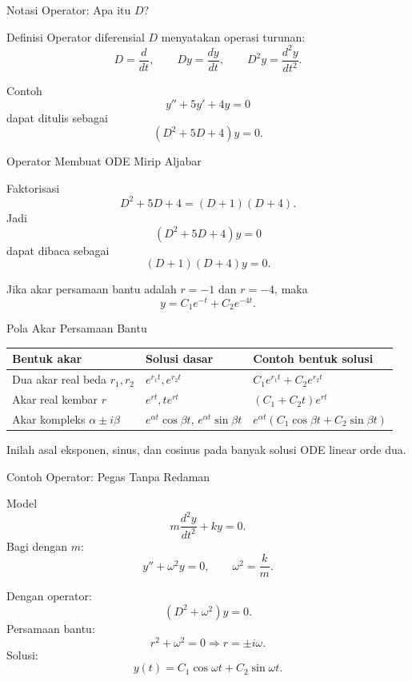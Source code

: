 \documentclass[aspectratio=169,11pt]{beamer}
\begin{document}
\begin{frame}{Notasi Operator: Apa itu $D$?}
\begin{block}{Definisi}
Operator diferensial $D$ menyatakan operasi turunan:
\[
D=\frac{d}{dt}, \qquad Dy=\frac{dy}{dt}, \qquad D^2y=\frac{d^2y}{dt^2}.
\]
\end{block}
\begin{exampleblock}{Contoh}
\[
 y''+5y'+4y=0
\]
dapat ditulis sebagai
\[
(D^2+5D+4)y=0.
\]
\end{exampleblock}
\end{frame}

\begin{frame}{Operator Membuat ODE Mirip Aljabar}
\begin{block}{Faktorisasi}
\[
D^2+5D+4=(D+1)(D+4).
\]
Jadi
\[
(D^2+5D+4)y=0
\]
dapat dibaca sebagai
\[
(D+1)(D+4)y=0.
\]
\end{block}
Jika akar persamaan bantu adalah $r=-1$ dan $r=-4$, maka
\[
\boxed{y=C_1e^{-t}+C_2e^{-4t}.}
\]
\end{frame}

\begin{frame}{Pola Akar Persamaan Bantu}
\scriptsize
\begin{tabular}{p{3.4cm}p{4.1cm}p{4.4cm}}
\toprule
\textbf{Bentuk akar} & \textbf{Solusi dasar} & \textbf{Contoh bentuk solusi} \\
\midrule
Dua akar real beda $r_1,r_2$ & $e^{r_1t}, e^{r_2t}$ & $C_1e^{r_1t}+C_2e^{r_2t}$ \\
Akar real kembar $r$ & $e^{rt}, te^{rt}$ & $(C_1+C_2t)e^{rt}$ \\
Akar kompleks $\alpha\pm i\beta$ & $e^{\alpha t}\cos\beta t$, $e^{\alpha t}\sin\beta t$ & $e^{\alpha t}(C_1\cos\beta t+C_2\sin\beta t)$ \\
\bottomrule
\end{tabular}
\vspace{0.2cm}
Inilah asal eksponen, sinus, dan cosinus pada banyak solusi ODE linear orde dua.
\end{frame}

\begin{frame}{Contoh Operator: Pegas Tanpa Redaman}
\begin{block}{Model}
\[
 m\frac{d^2y}{dt^2}+ky=0.
\]
Bagi dengan $m$:
\[
 y''+\omega^2y=0, \qquad \omega^2=\frac{k}{m}.
\]
\end{block}
Dengan operator:
\[
(D^2+\omega^2)y=0.
\]
Persamaan bantu:
\[
 r^2+\omega^2=0 \Rightarrow r=\pm i\omega.
\]
Solusi:
\[
\boxed{y(t)=C_1\cos\omega t+C_2\sin\omega t.}
\]
\end{frame}
\end{document}

